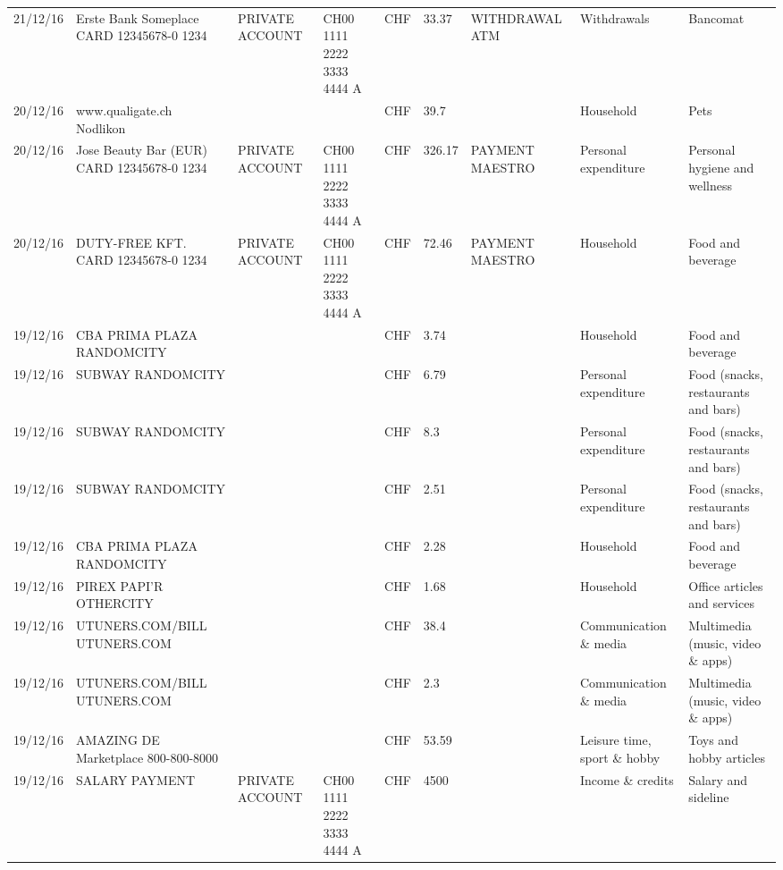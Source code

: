\begin{landscape}
\begin{table}[t]
\begin{center}
\begin{tabular}{lllllllll}
		21/12/16 & Erste Bank Someplace CARD 12345678-0 1234 & PRIVATE ACCOUNT & CH00 1111 2222 3333 4444 A & CHF   & 33.37 & WITHDRAWAL ATM & Withdrawals & Bancomat \\
		20/12/16 & www.qualigate.ch          Nodlikon &       &       & CHF   & 39.7  &       & Household & Pets \\
		20/12/16 & Jose Beauty Bar (EUR) CARD 12345678-0 1234 & PRIVATE ACCOUNT & CH00 1111 2222 3333 4444 A & CHF   & 326.17 & PAYMENT MAESTRO & Personal expenditure & Personal hygiene and wellness \\
		20/12/16 & DUTY-FREE KFT. CARD 12345678-0 1234 & PRIVATE ACCOUNT & CH00 1111 2222 3333 4444 A & CHF   & 72.46 & PAYMENT MAESTRO & Household & Food and beverage \\
		19/12/16 & CBA PRIMA PLAZA        RANDOMCITY &       &       & CHF   & 3.74  &       & Household & Food and beverage \\
		19/12/16 & SUBWAY                   RANDOMCITY &       &       & CHF   & 6.79  &       & Personal expenditure & Food (snacks, restaurants and bars) \\
		19/12/16 & SUBWAY                   RANDOMCITY &       &       & CHF   & 8.3   &       & Personal expenditure & Food (snacks, restaurants and bars) \\
		19/12/16 & SUBWAY                   RANDOMCITY &       &       & CHF   & 2.51  &       & Personal expenditure & Food (snacks, restaurants and bars) \\
		19/12/16 & CBA PRIMA PLAZA        RANDOMCITY &       &       & CHF   & 2.28  &       & Household & Food and beverage \\
		19/12/16 & PIREX PAPI'R             OTHERCITY &       &       & CHF   & 1.68  &       & Household & Office articles and services \\
		19/12/16 & UTUNERS.COM/BILL          UTUNERS.COM &       &       & CHF   & 38.4  &       & Communication \& media & Multimedia (music, video \& apps) \\
		19/12/16 & UTUNERS.COM/BILL          UTUNERS.COM &       &       & CHF   & 2.3   &       & Communication \& media & Multimedia (music, video \& apps) \\
		19/12/16 & AMAZING DE Marketplace    800-800-8000 &       &       & CHF   & 53.59 &       & Leisure time, sport \& hobby & Toys and hobby articles \\
		19/12/16 & SALARY PAYMENT & PRIVATE ACCOUNT & CH00 1111 2222 3333 4444 A & CHF   & 4500  &       & Income \& credits & Salary and sideline \\

\end{tabular}
\end{center}
\end{table}
\end{landscape}

